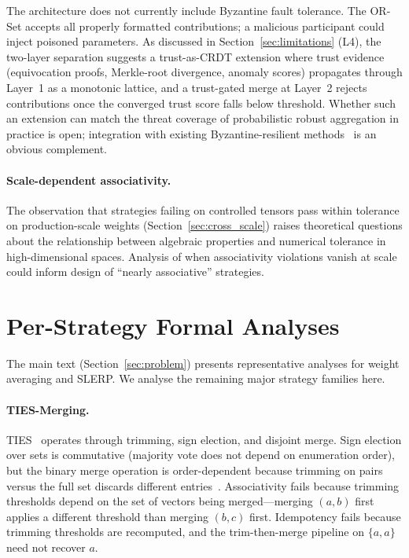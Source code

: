 \documentclass[10pt,letterpaper]{article}
\begin{document}
The architecture does not currently include Byzantine fault tolerance.
The OR-Set accepts all properly formatted contributions; a malicious participant could inject poisoned parameters.
As discussed in Section~\ref{sec:limitations} (L4), the two-layer separation suggests a trust-as-CRDT extension where trust evidence (equivocation proofs, Merkle-root divergence, anomaly scores) propagates through Layer~1 as a monotonic lattice, and a trust-gated merge at Layer~2 rejects contributions once the converged trust score falls below threshold.
Whether such an extension can match the threat coverage of probabilistic robust aggregation in practice is open; integration with existing Byzantine-resilient methods~\cite{blanchard2017machine} is an obvious complement.

\paragraph{Scale-dependent associativity.}
The observation that strategies failing on controlled tensors pass within tolerance on production-scale weights (Section~\ref{sec:cross_scale}) raises theoretical questions about the relationship between algebraic properties and numerical tolerance in high-dimensional spaces.
Analysis of when associativity violations vanish at scale could inform design of ``nearly associative'' strategies.

\section{Per-Strategy Formal Analyses}\label{app:strategy_analysis}

The main text (Section~\ref{sec:problem}) presents representative analyses for weight averaging and SLERP.
We analyse the remaining major strategy families here.

\paragraph{TIES-Merging.}
TIES~\cite{yadav2023ties} operates through trimming, sign election, and disjoint merge.
Sign election over sets is commutative (majority vote does not depend on enumeration order), but the binary merge operation is order-dependent because trimming on pairs versus the full set discards different entries~\cite{yadav2023ties}.
Associativity fails because trimming thresholds depend on the set of vectors being merged---merging $(a,b)$ first applies a different threshold than merging $(b,c)$ first.
Idempotency fails because trimming thresholds are recomputed, and the trim-then-merge pipeline on $\{a,a\}$ need not recover $a$.
\end{document}
